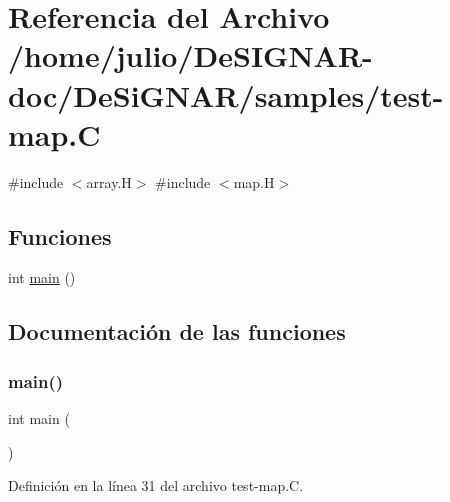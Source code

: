\hypertarget{test-map_8_c}{}\section{Referencia del Archivo /home/julio/\+De\+S\+I\+G\+N\+A\+R-\/doc/\+De\+Si\+G\+N\+A\+R/samples/test-\/map.C}
\label{test-map_8_c}
{\ttfamily \#include $<$array.\+H$>$}\newline
{\ttfamily \#include $<$map.\+H$>$}\newline
\subsection*{Funciones}
\begin{DoxyCompactItemize}
\item 
int \hyperlink{test-map_8_c_ae66f6b31b5ad750f1fe042a706a4e3d4}{main} ()
\end{DoxyCompactItemize}


\subsection{Documentación de las funciones}
\mbox{\label{test-map_8_c_ae66f6b31b5ad750f1fe042a706a4e3d4}} 
\subsubsection{\texorpdfstring{main()}{main()}}
{\footnotesize\ttfamily int main (\begin{DoxyParamCaption}{ }\end{DoxyParamCaption})}



Definición en la línea 31 del archivo test-\/map.\+C.

